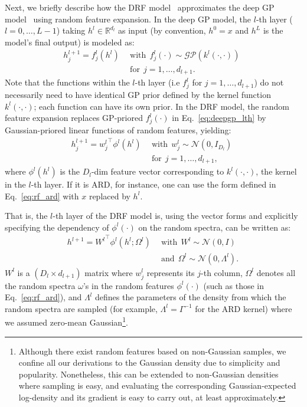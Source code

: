 \documentclass[conference]{IEEEtran}
\begin{document}

Next, we briefly describe how the DRF model~\cite{rfdnn17} approximates the deep GP model~\cite{deepgp13} using random feature expansion. In the deep GP model, the $l$-th layer ($l=0,\dots,L-1$) taking $h^l \in \mathbb{R}^{d_l}$ as input (by convention, $h^0 = x$ and $h^L$ is the model's final output) is modeled as:
\begin{equation}
\begin{split}
h^{l+1}_j = f^l_j(h^l)\ \ &\textrm{with} \ \ 
f^l_j(\cdot) \sim \mathcal{GP}(k^l(\cdot,\cdot)) 
\ \ \\ &\textrm{for} \ \ j=1,\dots,d_{l+1}.
\end{split}
\label{eq:deepgp_lth}
\end{equation}
Note that the functions within the $l$-th layer  (i.e $f^l_j$ for $j=1,\dots,d_{l+1}$) do not necessarily need to have identical GP prior defined by the kernel function $k^l(\cdot,\cdot)$; each function can have its own prior. In the DRF model, the random feature expansion replaces GP-priored $f^l_j(\cdot)$ in Eq.~\ref{eq:deepgp_lth} by Gaussian-priored linear functions of random features, yielding:
\begin{equation}
\begin{split}
h^{l+1}_j = {w^l_j}^\top \phi^l(h^l) \ \ &\textrm{with} \ \ 
w^l_j \sim \mathcal{N}(0, I_{D_l}) 
\ \ \\ &\textrm{for} \ \ j=1,\dots,d_{l+1},
\end{split}
\label{eq:rfdnn_lth}
\end{equation}
where $\phi^l(h^l)$ is the $D_l$-dim feature vector corresponding to 
$k^l(\cdot,\cdot)$, the kernel in the $l$-th layer. If it is ARD, for instance, 
one can use the form defined in Eq.~\ref{eq:rf_ard} with $x$ replaced by $h^l$. 

That is, the $l$-th layer of the DRF model is, using the vector forms and 
explicitly specifying the dependency of $\phi^l(\cdot)$ on the random spectra, 
can be written as:
\begin{equation}
\begin{split}
h^{l+1} = {W^l}^\top \phi^l(h^l; \Omega^l) \ \ &\textrm{with} \ \ 
W^l \sim \mathcal{N}(0, I)\ \ \\ &\textrm{and} \ \ 
\Omega^l \sim \mathcal{N}(0, \Lambda^l).
\end{split}
\label{eq:rfdnn_lth_vec}
\end{equation}
$W^l$ is a $(D_l \times d_{l+1})$ matrix where $w^l_j$ represents its $j$-th 
column, $\Omega^l$ denotes all the random spectra $\omega$'s in the random features 
$\phi^l(\cdot)$ (such as those in Eq.~\ref{eq:rf_ard}), and $\Lambda^l$ defines the parameters of the density from which the random spectra are sampled (for example, $\Lambda^l=\Gamma^{-1}$ 
for the ARD kernel) where we assumed zero-mean Gaussian\footnote{Although there 
exist random features based on non-Gaussian samples, we confine all our derivations 
to the Gaussian density due to simplicity and popularity. 
Nonetheless, this can be extended to non-Gaussian densities where sampling is easy, and evaluating the corresponding Gaussian-expected log-density and its gradient is easy to carry out, at least approximately.}.  
\end{document}
